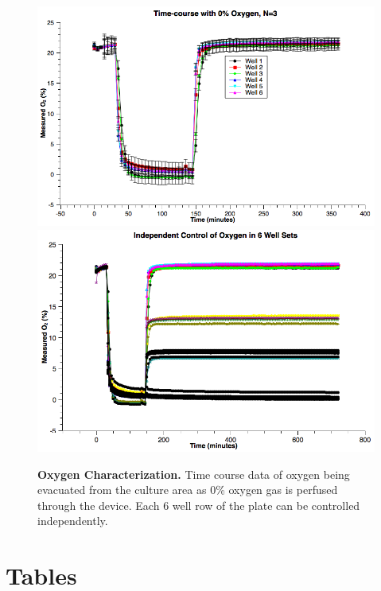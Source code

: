\begin{figure}
\includegraphics[scale=0.3]{../presentation-figures/6-well-plot.png} %
\includegraphics[scale=0.3]{../presentation-figures/24-well-plot.png} %
\caption{
{\bf Oxygen Characterization.}  Time course data of oxygen being evacuated from the culture area as 0\% oxygen gas is perfused through the device. Each 6 well row of the plate can be controlled independently.  
}
\label{Figure_label}
\end{figure}


\section*{Tables}
% 
%
%

